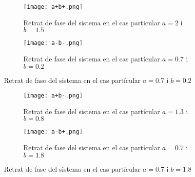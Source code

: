 \documentclass{article}
\begin{document}
\begin{figure}[!ht]
  \centering
  \begin{subfigure}{0.47\textwidth}
    \centering
    \texttt{[image: a+b+.png]}
    \caption{Retrat de fase del sistema en el cas particular $a=2$ i $b=1.5$}
  \end{subfigure}
  \hfill
  \begin{subfigure}{0.47\textwidth}
    \centering
    \texttt{[image: a-b-.png]}
    \caption{Retrat de fase del sistema en el cas partícular $a=0.7$ i $b=0.2$}
  \end{subfigure}
\end{figure}
\begin{figure}[!ht]
  \begin{subfigure}{0.47\textwidth}
    \centering
    \texttt{[image: a+b-.png]}
    \caption{Retrat de fase del sistema en el cas partícular $a=1.3$ i $b=0.8$}
  \end{subfigure}
  \hfill
  \begin{subfigure}{0.47\textwidth}
    \centering
    \texttt{[image: a-b+.png]}
    \caption{Retrat de fase del sistema en el cas partícular $a=0.7$ i $b=1.8$}
  \end{subfigure}
\end{figure}

\newpage
\end{document}
